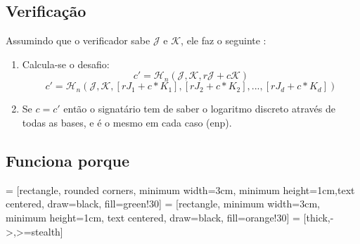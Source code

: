 \subsection*{Verificação}

Assumindo que o verificador sabe $\mathcal{J}$ e $\mathcal{K}$, ele faz o seguinte :

\begin{enumerate}
	\item Calcula-se o desafio:\vspace{.175cm}
    \[c' = \mathcal{H}_n(\mathcal{J},\mathcal{K},r \mathcal{J} + c \mathcal{K} )\]	
    \[c' = \mathcal{H}_n(\mathcal{J},\mathcal{K},[r J_1 + c*K_1],[r J_2 + c*K_2],...,[r J_d + c*K_d])\]
	\item Se $c = c'$ então o signatário tem de saber o logaritmo discreto através de todas as bases, e é o mesmo em cada caso (enp).
\end{enumerate}

\subsection*{Funciona porque}

 = [rectangle, rounded corners, minimum width=3cm, minimum height=1cm,text centered, draw=black, fill=green!30]
 = [rectangle, minimum width=3cm, minimum height=1cm, text centered, draw=black, fill=orange!30]
 = [thick,->,>=stealth]


